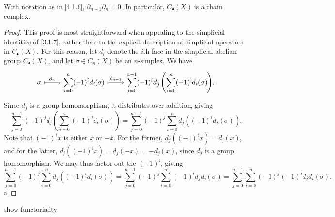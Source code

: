 \begin{proposition}\label{4.1.?}
	With notation as in \cref{4.1.6}, $\partial _{n-1} \partial _n=0$. In particular, $C_{\bullet} (X)$ is a chain complex.
\end{proposition}
\begin{proof}
	This proof is most straightforward when appealing to the simplicial identities of \cref{3.1.7}, rather than to the explicit description of simplicial operators in $C_{\bullet} (X)$. For this reason, let $d_i$ denote the $i$th face in the simplicial abelian group $C_{\bullet} (X)$, and let $\sigma\in C_n(X)$ be an $n$-simplex. We have
	\[\begin{tikzcd}
	\sigma & {\displaystyle{\sum_{i=0}^n(-1)^id_i(\sigma)}} & {\displaystyle{\sum_{j=0}^{n-1}(-1)^id_j\left(\sum_{i=0}^n(-1)^id_i(\sigma)\right)}.}
	\arrow["{\partial_n}", maps to, from=1-1, to=1-2]
	\arrow["{\partial_{n-1}}", maps to, from=1-2, to=1-3]
	\end{tikzcd}\]
	Since $d_j$ is a group homomorphism, it distributes over addition, giving
	\[
		\sum_{j=0}^{n-1} (-1)^jd_j\left( \sum_{i=0}^{n} (-1)^id_i(\sigma) \right) =\sum_{j=0}^{n-1} (-1)^j \sum_{i=0}^{n} d_j\left( (-1)^id_i(\sigma) \right) 
	.\]
	Note that $(-1)^ix$ is either $x$ or $-x$. For the former, $d_j((-1)^ix)=d_j(x)$, and for the latter, $d_j((-1)^ix)=d_j(-x)=-d_j(x)$, since $d_j$ is a group homomorphism. We may thus factor out the $(-1)^i$, giving
	\[
		\sum_{j=0}^{n-1}(-1)^j\sum_{i=0}^n d_j\left((-1)^id_i(\sigma)\right)=\sum_{j=0}^{n-1} (-1)^j \sum_{i=0}^{n} (-1)^id_jd_i(\sigma)=\sum_{j=0}^{n-1} \sum_{i=0}^{n} (-1)^j(-1)^i d_jd_i(\sigma)
	.\]
	a
\end{proof}


\begin{remark}\label{4.1.??}
	show functoriality
\end{remark}


